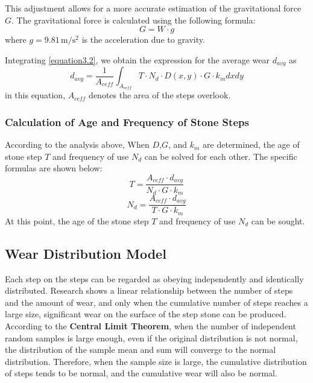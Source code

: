 \documentclass[12pt]{article}  %
\numberwithin{equation}{section} %
\begin{document}
\quad This adjustment allows for a more accurate estimation of the gravitational force $G$. The gravitational force is calculated using the following formula:
\begin{equation}
    G = W \cdot g
\end{equation}
where $g = 9.81\,\mathrm{m/s^2}$ \cite{9}is the acceleration due to gravity.


Integrating \autoref{equation3.2}, we obtain the expression for the average wear $d_{avg}$ as
\begin{equation}
    d_{avg} = \frac{1}{A_{ceff}}\int_{A_{ceff}} T\cdot{N_d}\cdot{D(x,y)}\cdot{G}\cdot{k_m}dxdy
\end{equation}
in this equation, $A_{ceff}$ denotes the area of the steps overlook.

\subsubsection{Calculation of Age and Frequency of Stone Steps}
According to the analysis above, When $D$,$G$, and $k_m$ are determined,  the age of stone step $T$ and frequency of use $N_d$ can be solved for each other. The specific formulas are shown below:
\begin{equation}
    T = \frac{A_{ceff}\cdot{d_{avg}}}{N_d\cdot{G}\cdot{k_m}}
\end{equation}
\begin{equation}
    N_d = \frac{A_{ceff}\cdot{d_{avg}}}{T\cdot{G}\cdot{k_m}}
\end{equation}
At this point, the age of the stone step $T$ and frequency of use $N_d$ can be sought.

\subsection{Wear Distribution Model}
Each step on the steps can be regarded as obeying independently and identically distributed. Research shows a linear relationship between the number of steps and the amount of wear, and only when the cumulative number of steps reaches a large size, significant wear on the surface of the step stone can be produced.  According to the \textbf{Central Limit Theorem}, when the number of independent random samples is large enough, even if the original distribution is not normal, the distribution of the sample mean and sum will converge to the normal distribution. Therefore, when the sample size is large, the cumulative distribution of steps tends to be normal, and the cumulative wear will also be normal.
\end{document}
